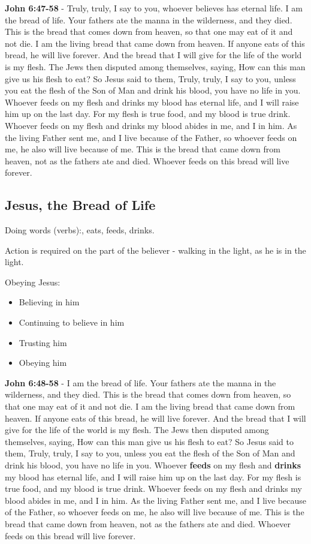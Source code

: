 \documentclass[11pt]{article}
\begin{document}
\textbf{John 6:47-58} - Truly, truly, I say to you, whoever believes has eternal life. I am the bread of life. Your fathers ate the manna in the wilderness, and they died. This is the bread that comes down from heaven, so that one may eat of it and not die. I am the living bread that came down from heaven. If anyone eats of this bread, he will live forever. And the bread that I will give for the life of the world is my flesh. The Jews then disputed among themselves, saying, How can this man give us his flesh to eat? So Jesus said to them, Truly, truly, I say to you, unless you eat the flesh of the Son of Man and drink his blood, you have no life in you. Whoever feeds on my flesh and drinks my blood has eternal life, and I will raise him up on the last day. For my flesh is true food, and my blood is true drink. Whoever feeds on my flesh and drinks my blood abides in me, and I in him. As the living Father sent me, and I live because of the Father, so whoever feeds on me, he also will live because of me. This is the bread that came down from heaven, not as the fathers ate and died. Whoever feeds on this bread will live forever.

\subsection{Jesus, the Bread of Life}
\label{sec:org95cc7a2}
Doing words (verbs):, eats, feeds, drinks.

Action is required on the part of the believer - walking in the light, as he is in the light.

Obeying Jesus:
\begin{itemize}
\item Believing in him
\item Continuing to believe in him
\item Trusting him
\item Obeying him
\end{itemize}

\textbf{John 6:48-58} - I am the bread of life. Your fathers ate the manna in the wilderness, and they died. This is the bread that comes down from heaven, so that one may eat of it and not die. I am the living bread that came down from heaven. If anyone eats of this bread, he will live forever. And the bread that I will give for the life of the world is my flesh. The Jews then disputed among themselves, saying, How can this man give us his flesh to eat? So Jesus said to them, Truly, truly, I say to you, unless you eat the flesh of the Son of Man and drink his blood, you have no life in you. Whoever \textbf{feeds} on my flesh and \textbf{drinks} my blood has eternal life, and I will raise him up on the last day. For my flesh is true food, and my blood is true drink. Whoever feeds on my flesh and drinks my blood abides in me, and I in him. As the living Father sent me, and I live because of the Father, so whoever feeds on me, he also will live because of me. This is the bread that came down from heaven, not as the fathers ate and died. Whoever feeds on this bread will live forever.
\end{document}
